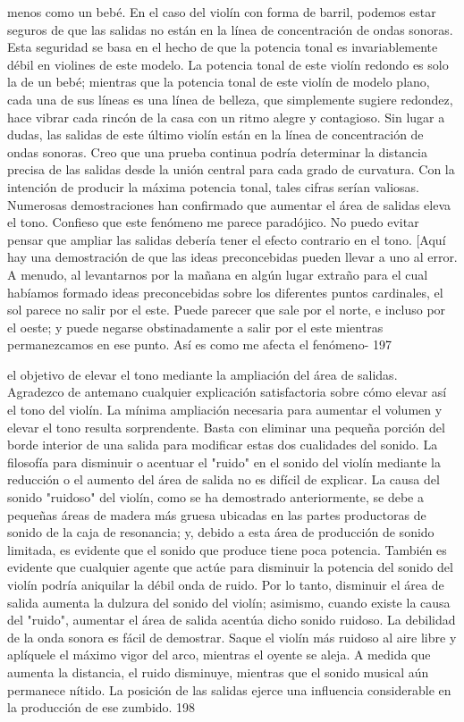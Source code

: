 menos como un bebé. En el caso del violín con forma de barril, podemos estar seguros de que las salidas no están en la línea de concentración de ondas sonoras. Esta seguridad se basa en el hecho de que la potencia tonal es invariablemente débil en violines de este modelo. La potencia tonal de este violín redondo es solo la de un bebé; mientras que la potencia tonal de este violín de modelo plano, cada una de sus líneas es una línea de belleza, que simplemente sugiere redondez, hace vibrar cada rincón de la casa con un ritmo alegre y contagioso. Sin lugar a dudas, las salidas de este último violín están en la línea de concentración de ondas sonoras. Creo que una prueba continua podría determinar la distancia precisa de las salidas desde la unión central para cada grado de curvatura. Con la intención de producir la máxima potencia tonal, tales cifras serían valiosas.
Numerosas demostraciones han confirmado que aumentar el área de salidas eleva el tono. Confieso que este fenómeno me parece paradójico. No puedo evitar pensar que ampliar las salidas debería tener el efecto contrario en el tono.
[Aquí hay una demostración de que las ideas preconcebidas pueden llevar a uno al error. A menudo, al levantarnos por la mañana en algún lugar extraño para el cual habíamos formado ideas preconcebidas sobre los diferentes puntos cardinales, el sol parece no salir por el este. Puede parecer que sale por el norte, e incluso por el oeste; y puede negarse obstinadamente a salir por el este mientras permanezcamos en ese punto. Así es como me afecta el fenómeno-
197

el objetivo de elevar el tono mediante la ampliación del área de salidas. Agradezco de antemano cualquier explicación satisfactoria sobre cómo elevar así el tono del violín.
La mínima ampliación necesaria para aumentar el volumen y elevar el tono resulta sorprendente. Basta con eliminar una pequeña porción del borde interior de una salida para modificar estas dos cualidades del sonido.
La filosofía para disminuir o acentuar el "ruido" en el sonido del violín mediante la reducción o el aumento del área de salida no es difícil de explicar. La causa del sonido "ruidoso" del violín, como se ha demostrado anteriormente, se debe a pequeñas áreas de madera más gruesa ubicadas en las partes productoras de sonido de la caja de resonancia; y, debido a esta área de producción de sonido limitada, es evidente que el sonido que produce tiene poca potencia. También es evidente que cualquier agente que actúe para disminuir la potencia del sonido del violín podría aniquilar la débil onda de ruido. Por lo tanto, disminuir el área de salida aumenta la dulzura del sonido del violín; asimismo, cuando existe la causa del "ruido", aumentar el área de salida acentúa dicho sonido ruidoso.
La debilidad de la onda sonora es fácil de demostrar. Saque el violín más ruidoso al aire libre y aplíquele el máximo vigor del arco, mientras el oyente se aleja. A medida que aumenta la distancia, el ruido disminuye, mientras que el sonido musical aún permanece nítido. La posición de las salidas ejerce una influencia considerable en la producción de ese zumbido.
198

